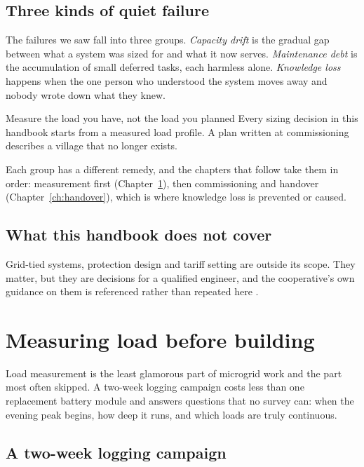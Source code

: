 \subsection{Three kinds of quiet failure}

The failures we saw fall into three groups. \emph{Capacity drift} is the gradual gap
between what a system was sized for and what it now serves. \emph{Maintenance debt} is
the accumulation of small deferred tasks, each harmless alone. \emph{Knowledge loss}
happens when the one person who understood the system moves away and nobody wrote down
what they knew.

\begin{principle}{Measure the load you have, not the load you planned}
Every sizing decision in this handbook starts from a measured load profile. A plan
written at commissioning describes a village that no longer exists.
\end{principle}

Each group has a different remedy, and the chapters that follow take them in order:
measurement first (Chapter~\ref{ch:measuring-load}), then commissioning and handover
(Chapter~\ref{ch:handover}), which is where knowledge loss is prevented or caused.

\subsection{What this handbook does not cover}

Grid-tied systems, protection design and tariff setting are outside its scope. They
matter, but they are decisions for a qualified engineer, and the cooperative's own
guidance on them is referenced rather than repeated here \cite{coop-protection}.

\section{Measuring load before building}
\label{ch:measuring-load}

Load measurement is the least glamorous part of microgrid work and the part most often
skipped. A two-week logging campaign costs less than one replacement battery module and
answers questions that no survey can: when the evening peak begins, how deep it runs,
and which loads are truly continuous.

\subsection{A two-week logging campaign}

